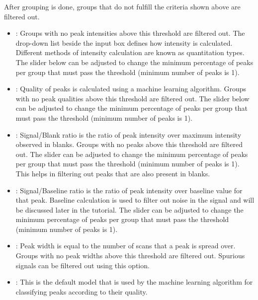 \documentclass[letterpaper,10pt,english,openany,oneside]{sphinxmanual}
\begin{document}
After grouping is done, groups that do not fulfill the criteria shown above are filtered out.
\begin{itemize}
\item {} 
: Groups with no peak intensities above this threshold are filtered out. The drop-down list beside the input box defines how intensity is calculated. Different methods of intensity calculation are known as quantitation types. The slider below can be adjusted to change the minimum percentage of peaks per group that must pass the threshold (minimum number of peaks is 1).

\item {} 
: Quality of peaks is calculated using a machine learning algorithm. Groups with no peak qualities above this threshold are filtered out. The slider below can be adjusted to change the minimum percentage of peaks per group that must pass the threshold (minimum number of peaks is 1).

\item {} 
: Signal/Blank ratio is the ratio of peak intensity over maximum intensity observed in blanks. Groups with no peaks above this threshold are filtered out. The slider can be adjusted to change the minimum percentage of peaks per group that must pass the threshold (minimum number of peaks is 1). This helps in filtering out peaks that are also present in blanks.

\item {} 
: Signal/Baseline ratio is the ratio of peak intensity over baseline value for that peak. Baseline calculation is used to filter out noise in the signal and will be discussed later in the tutorial. The slider can be adjusted to change the minimum percentage of peaks per group that must pass the threshold (minimum number of peaks is 1).

\item {} 
: Peak width is equal to the number of scans that a peak is spread over. Groups with no peak widths above this threshold are filtered out. Spurious signals can be filtered out using this option.

\item {} 
: This is the default model that is used by the machine learning algorithm for classifying peaks according to their quality.

\end{itemize}
\end{document}
